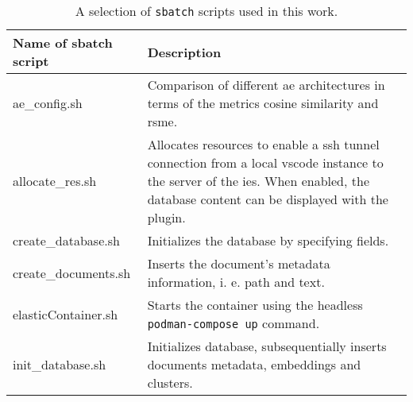 \begin{table}[]
    \caption{A selection of \texttt{sbatch} scripts used in this work.}
    \begin{tabular}{|
    >{\columncolor[HTML]{EFEFEF}}p{} |p{}|}
    \hline
    \cellcolor[HTML]{C0C0C0}\textbf{Name of sbatch script} & \cellcolor[HTML]{C0C0C0}\textbf{Description}                                                                                                                                                                                                                      \\ \hline
    ae\_config.sh                                          & Comparison of different \ac{ae} architectures in terms of the metrics cosine similarity and \ac{rsme}.                                                                                                                                                                     \\ \hline
    allocate\_res.sh                                       & Allocates resources to enable a \ac{ssh} tunnel connection from a local \ac{vscode} instance to the server of the \ac{ies}. 
                                                                When enabled, the database content can be displayed with the \databaseName{} plugin.\\ \hline
    create\_database.sh                                    & Initializes the database by specifying fields.                                                                                                                                                                                                                    \\ \hline
    create\_documents.sh                                   & Inserts the document's metadata information, i. e. path and text.                                                                                                                                                                                                   \\ \hline
    elasticContainer.sh                                    & Starts the \databaseName{} container using the headless \texttt{podman-compose up} command.                                                                                                                                     \\ \hline
    init\_database.sh                                      & Initializes database, subsequentially inserts documents metadata, embeddings and clusters.                                                                                                                                                                        \\ \hline

\end{tabular}
\end{table}
